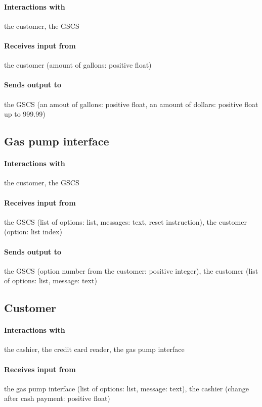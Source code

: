 \paragraph{Interactions with} the customer, the GSCS

\paragraph{Receives input from} the customer (amount of gallons: positive float)

\paragraph{Sends output to} the GSCS (an amout of gallons: positive float, an
amount of dollars: positive float up to 999.99)

\subsection{Gas pump interface}

\paragraph{Interactions with} the customer, the GSCS

\paragraph{Receives input from} the GSCS (list of options: list, messages: text,
reset instruction), the customer (option: list index)

\paragraph{Sends output to} the GSCS (option number from the customer: positive
integer), the customer (list of options: list, message: text)

\subsection{Customer}

\paragraph{Interactions with} the cashier, the credit card reader, the gas pump
interface

\paragraph{Receives input from} the gas pump interface (list of options: list,
message: text), the cashier (change after cash payment: positive float)

